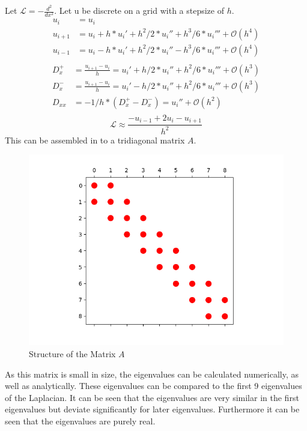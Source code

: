 \documentclass{article}
\begin{document}
Let $\mathcal{L}=-\frac{d^{2}}{d x^{2}}$. Let u be discrete on a grid with a stepsize of $h$.
\begin{align}
    u_i &= u_i\\
    u_{i+1} &= u_i + h * u_i' + h^2/2 * u_i'' + h^3/6 * u_i''' + \mathcal{O}\left(h^4\right)\\
    u_{i-1} &= u_i - h * u_i' + h^2/2 * u_i'' - h^3/6 * u_i''' + \mathcal{O}\left(h^4\right)\\
\end{align}
\begin{align}
    D_x^+ &= \frac{u_{i+1}-u_i}{h} = u_i' + h/2 * u_i'' + h^2/6 * u_i''' + \mathcal{O}\left(h^3\right)\\
    D_x^- &= \frac{u_{i+1}-u_i}{h} = u_i' - h/2 * u_i'' + h^2/6 * u_i''' + \mathcal{O}\left(h^3\right)\\
    D_{xx} &= -1/h*\left(D_x^+ - D_x^-\right) = u_i'' + \mathcal{O}\left(h^2\right)\\
\end{align}
\begin{equation}
    \mathcal{L} \approx \frac{-u_{i-1}+2u_i-u_{i+1}}{h^2}
\end{equation}
This can be assembled in to a tridiagonal matrix $A$.
\begin{figure}[H]
    \centering
    \includegraphics[width=.8\linewidth]{2spy.png}
    \caption{Structure of the Matrix $A$}
\end{figure}
As this matrix is small in size, the eigenvalues can be calculated numerically, as well as analytically. These eigenvalues can be compared to the first 9 eigenvalues of the Laplacian. It can be seen that the eigenvalues are very similar in the first eigenvalues but deviate significantly for later eigenvalues. Furthermore it can be seen that the eigenvalues are purely real.
\end{document}

